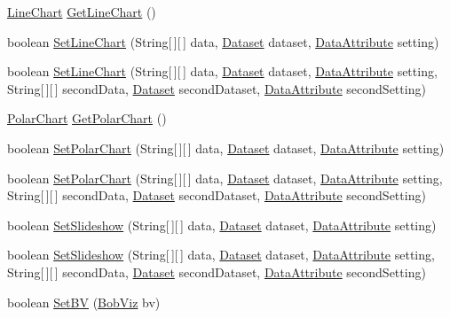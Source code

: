 \begin{DoxyCompactItemize}
\item 
\hyperlink{class_line_chart}{Line\-Chart} \hyperlink{class_visualisation_a1f525b81f378f7e93813dd4eeab98c6c}{Get\-Line\-Chart} ()
\item 
boolean \hyperlink{class_visualisation_acb9a2f1777ff1761226317eb94b67806}{Set\-Line\-Chart} (String\mbox{[}$\,$\mbox{]}\mbox{[}$\,$\mbox{]} data, \hyperlink{class_dataset}{Dataset} dataset, \hyperlink{class_data_attribute}{Data\-Attribute} setting)
\item 
boolean \hyperlink{class_visualisation_a7866172e66f550c3f18a256844ea482e}{Set\-Line\-Chart} (String\mbox{[}$\,$\mbox{]}\mbox{[}$\,$\mbox{]} data, \hyperlink{class_dataset}{Dataset} dataset, \hyperlink{class_data_attribute}{Data\-Attribute} setting, String\mbox{[}$\,$\mbox{]}\mbox{[}$\,$\mbox{]} second\-Data, \hyperlink{class_dataset}{Dataset} second\-Dataset, \hyperlink{class_data_attribute}{Data\-Attribute} second\-Setting)
\item 
\hyperlink{class_polar_chart}{Polar\-Chart} \hyperlink{class_visualisation_a7eb6c2360919ae355ec7317fc3063adf}{Get\-Polar\-Chart} ()
\item 
boolean \hyperlink{class_visualisation_a14d3817f0f5a36a9f9ce1d002a445ed7}{Set\-Polar\-Chart} (String\mbox{[}$\,$\mbox{]}\mbox{[}$\,$\mbox{]} data, \hyperlink{class_dataset}{Dataset} dataset, \hyperlink{class_data_attribute}{Data\-Attribute} setting)
\item 
boolean \hyperlink{class_visualisation_a9eafb9929af62c6c4f297a5bd3fb451a}{Set\-Polar\-Chart} (String\mbox{[}$\,$\mbox{]}\mbox{[}$\,$\mbox{]} data, \hyperlink{class_dataset}{Dataset} dataset, \hyperlink{class_data_attribute}{Data\-Attribute} setting, String\mbox{[}$\,$\mbox{]}\mbox{[}$\,$\mbox{]} second\-Data, \hyperlink{class_dataset}{Dataset} second\-Dataset, \hyperlink{class_data_attribute}{Data\-Attribute} second\-Setting)
\item 
boolean \hyperlink{class_visualisation_ac8abbff8b49eef0173dccfa0e541c66b}{Set\-Slideshow} (String\mbox{[}$\,$\mbox{]}\mbox{[}$\,$\mbox{]} data, \hyperlink{class_dataset}{Dataset} dataset, \hyperlink{class_data_attribute}{Data\-Attribute} setting)
\item 
boolean \hyperlink{class_visualisation_a657703ecbea8ef32283ecced7af53e77}{Set\-Slideshow} (String\mbox{[}$\,$\mbox{]}\mbox{[}$\,$\mbox{]} data, \hyperlink{class_dataset}{Dataset} dataset, \hyperlink{class_data_attribute}{Data\-Attribute} setting, String\mbox{[}$\,$\mbox{]}\mbox{[}$\,$\mbox{]} second\-Data, \hyperlink{class_dataset}{Dataset} second\-Dataset, \hyperlink{class_data_attribute}{Data\-Attribute} second\-Setting)
\item 
boolean \hyperlink{class_visualisation_a8e092a6855febe448999fd1109bc7764}{Set\-B\-V} (\hyperlink{class_bob_viz}{Bob\-Viz} bv)
\end{DoxyCompactItemize}
